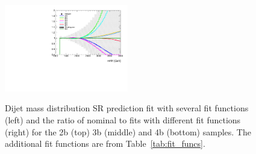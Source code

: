 \begin{figure}[htbp!]
\begin{center}
\includegraphics[width=0.48\textwidth,angle=-90]{figures/boosted/Syst_Smooth/smoothFuncCompare_44_comp_ratio.pdf} \\
\caption{ Dijet mass distribution SR prediction fit with several fit functions (left) and the ratio of nominal to fits with different fit functions (right)  for the 2b (top) 3b (middle) and 4b (bottom) samples. The additional fit functions are from Table~\ref{tab:fit_funcs}.}
\label{fig:qcd_fit_funcs_sys}
\end{center}
\end{figure}

